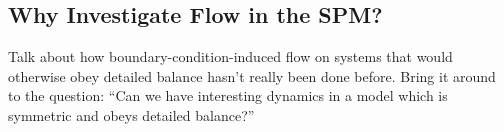 \subsection{Why Investigate Flow in the SPM?}
Talk about how boundary-condition-induced flow on systems that would otherwise obey detailed balance hasn't really been done before.
Bring it around to the question:
``Can we have interesting dynamics in a model which is symmetric and obeys detailed balance?''